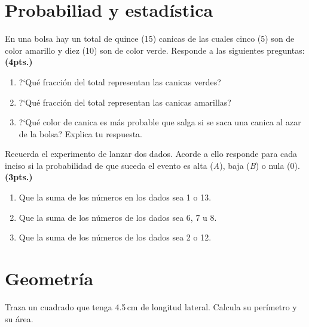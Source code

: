 \documentclass[11pt]{article}
\begin{document}
\vspace{5mm}

\begin{centering}


\end{centering}

\section{Probabiliad y estad\'istica}

En una bolsa hay un total de quince (15) canicas de las cuales cinco (5) son de
color amarillo y diez (10) son de color verde. Responde a las siguientes
preguntas: \hfill  \textbf{(4pts.)}

\begin{enumerate}[label=\alph*)] \itemsep-.3em
\item ?`Qu\'e fracci\'on del total representan las canicas verdes?
\item ?`Qu\'e fracci\'on del total representan las canicas amarillas?
\item ?`Qu\'e color de canica es m\'as probable que salga si se saca una canica
al azar de la bolsa? Explica tu respuesta.
\end{enumerate}

\vspace{15mm}

Recuerda el experimento de lanzar dos dados. Acorde a ello responde para cada
inciso si la probabilidad de que suceda el evento es alta (\emph{A}), baja
(\emph{B}) o nula (0). \hfill  \textbf{(3pts.)}

\begin{enumerate}[label=\alph*)] \itemsep-.3em
\item Que la suma de los n\'umeros en los dados sea 1 o 13.
\item Que la suma de los n\'umeros de los dados sea 6, 7 u 8.
\item Que la suma de los n\'umeros de los dados sea 2 o 12.
\end{enumerate}

\section{Geometr\'ia}
    
Traza un cuadrado que tenga 4.5\,cm de longitud lateral. Calcula su per\'imetro y
su \'area.
\end{document}
